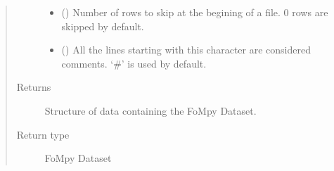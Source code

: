 \documentclass[letterpaper,10pt,english,openany, oneside]{sphinxmanual}
\begin{document}
\begin{fulllineitems}
\begin{quote}
\begin{description}
\begin{itemize}
\item {} 
 () \textendash{} Number of rows to skip at the begining of a file. 0 rows are skipped by default.

\item {} 
 () \textendash{} All the lines starting with this character are considered comments.
‘\#’ is used by default.

\end{itemize}

\item[{Returns}] \leavevmode
{} \textendash{} Structure of data containing the FoMpy Dataset.

\item[{Return type}] \leavevmode
FoMpy Dataset

\end{description}\end{quote}

\end{fulllineitems}

\end{document}
